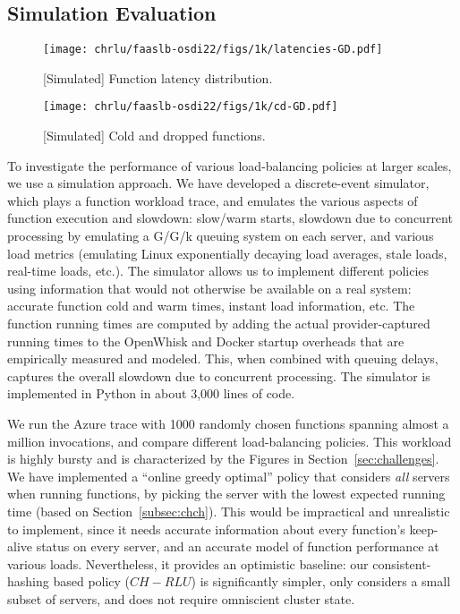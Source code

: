 \subsection{Simulation Evaluation}
\label{subsec:eval-sim}


\begin{figure}
  \centering
  \texttt{[image: chrlu/faaslb-osdi22/figs/1k/latencies-GD.pdf]}
  \caption{[Simulated] Function latency distribution. }
  \label{fig:1k-lat}
  
\end{figure}

\begin{figure}
  \centering
  \texttt{[image: chrlu/faaslb-osdi22/figs/1k/cd-GD.pdf]}
  \caption{[Simulated] Cold and dropped functions.}
  \label{fig:1k-cd}
\end{figure}



To investigate the performance of various load-balancing policies at larger scales, we use a simulation approach.
We have developed a discrete-event simulator, which plays a function workload trace, and emulates the various aspects of function execution and slowdown: slow/warm starts, slowdown due to concurrent processing by emulating a G/G/k queuing system on each server, and various load metrics (emulating Linux exponentially decaying load averages, stale loads, real-time loads, etc.). 
The simulator allows us to implement different policies using information that would not otherwise be available on a real system: accurate function cold and warm times, instant load information, etc.
The function running times are computed by adding the actual provider-captured running times to the OpenWhisk and Docker startup overheads that are empirically measured and modeled.
This, when combined with queuing delays, captures the overall slowdown due to concurrent processing.
The simulator is implemented in Python in about 3,000 lines of code. 

We run the Azure trace with 1000 randomly chosen functions spanning almost a million invocations, and compare different load-balancing policies.
This workload is highly bursty and is characterized by the Figures in Section~\ref{sec:challenges}. 
We have implemented a ``online greedy optimal'' policy that considers \emph{all} servers when running functions, by picking the server with the lowest expected running time (based on Section~\ref{subsec:chch}).
This would be impractical and unrealistic to implement, since it needs accurate information about every function's keep-alive status on every server, and an accurate model of function performance at various loads.
Nevertheless, it provides an optimistic baseline: our consistent-hashing based policy ($CH-RLU$) is significantly simpler, only considers a small subset of servers, and does not require omniscient cluster state. 

